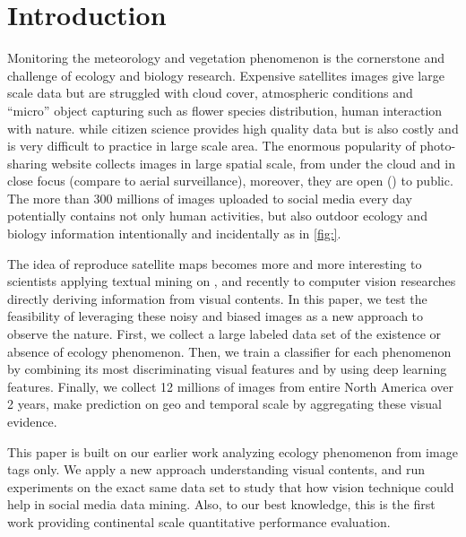 \documentclass[10pt]{article}
\begin{document}
\section{Introduction}

Monitoring the meteorology and vegetation phenomenon is the cornerstone and challenge of ecology and biology research. Expensive satellites images give large scale data but are struggled with cloud cover, 
atmospheric conditions and ``micro'' object capturing such as flower species distribution, human interaction with nature.
while citizen science provides high quality data but is also costly and is very difficult to practice in large scale area.
The enormous popularity of photo-sharing website collects images in large spatial scale, from under the cloud and in close focus (compare to aerial surveillance), 
moreover, they are open () to public.
The more than 300 millions of images uploaded to social media every day
\cite{https://zephoria.com/top-15-valuable-facebook-statistics/}
 potentially contains not only human activities, but also outdoor ecology and biology information intentionally and incidentally as in \ref{fig:}.

The idea of reproduce satellite maps becomes more and more interesting to scientists applying textual mining on , 
and recently to computer vision researches directly deriving  information from visual contents.
In this paper, we test the feasibility of leveraging these noisy and biased images as a new approach to observe the nature. 
First, we collect a large labeled data set of the existence or absence of ecology phenomenon. 
Then, we train a classifier for each phenomenon by combining its most discriminating visual features and by using deep learning features. 
Finally, we collect 12 millions of images from entire North America over 2 years, make prediction on geo and temporal scale by aggregating these visual evidence.

This paper is built on our earlier work  analyzing ecology phenomenon from image tags only. We apply a new approach understanding visual contents, and run experiments on the exact same data set to study that how vision technique could help in social media data mining. Also, to our best knowledge, this is the first work providing continental scale quantitative performance evaluation.
\end{document}

